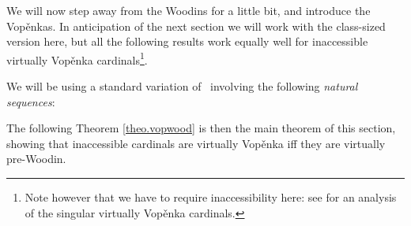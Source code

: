 \documentclass[../../main]{subfiles}
\begin{document}
We will now step away from the Woodins for a little bit, and introduce the Vop\v enkas. In anticipation of the next section we will work with the class-sized version here, but all the following results work equally well for inaccessible virtually Vop\v enka cardinals\footnote{Note however that we have to require inaccessibility here: see \cite{WilsonVopenka} for an analysis of the singular virtually Vop\v enka cardinals.}.


We will be using a standard variation of \gvp\, involving the following \textit{natural sequences}:



The following Theorem \ref{theo.vopwood} is then the main theorem of this section, showing that inaccessible cardinals are virtually Vop\v enka iff they are virtually pre-Woodin. 
\end{document}
